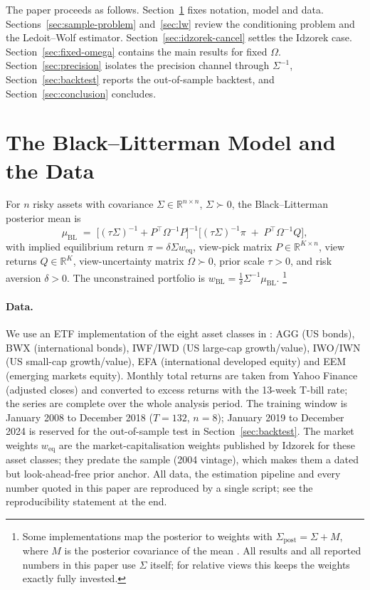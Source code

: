 \documentclass[a4paper,11pt]{article}
\theoremstyle{plain}
\theoremstyle{definition}
\newcommand{\R}{\mathbb{R}}
\newcommand{\Sig}{\Sigma}
\newcommand{\Om}{\Omega}
\newcommand{\muBL}{\mu_{\mathrm{BL}}}
\begin{document}
The paper proceeds as follows. Section~\ref{sec:blm-brief} fixes notation,
model and data. Sections~\ref{sec:sample-problem} and~\ref{sec:lw} review
the conditioning problem and the Ledoit--Wolf estimator.
Section~\ref{sec:idzorek-cancel} settles the Idzorek case.
Section~\ref{sec:fixed-omega} contains the main results for fixed
$\Omega$. Section~\ref{sec:precision} isolates the precision channel
through $\Sigma^{-1}$, Section~\ref{sec:backtest} reports the
out-of-sample backtest, and Section~\ref{sec:conclusion} concludes.

\section{The Black--Litterman Model and the Data}
\label{sec:blm-brief}

For $n$ risky assets with covariance $\Sigma\in\R^{n\times n}$,
$\Sigma\succ 0$, the Black--Litterman posterior mean is
\begin{equation}
\label{eq:bl-posterior}
  \muBL \;=\; \bigl[(\tau\Sig)^{-1} + P^\top\Om^{-1}P\bigr]^{-1}
              \bigl[(\tau\Sig)^{-1}\pi \;+\; P^\top\Om^{-1}Q\bigr],
\end{equation}
with implied equilibrium return $\pi = \delta\Sigma w_{\mathrm{eq}}$,
view-pick matrix $P\in\R^{K\times n}$, view returns $Q\in\R^K$,
view-uncertainty matrix $\Om\succ 0$, prior scale $\tau>0$, and risk
aversion $\delta>0$. The unconstrained portfolio is
$w_{\mathrm{BL}} = \tfrac{1}{\delta}\Sigma^{-1}\muBL$.%
\footnote{Some implementations map the posterior to weights with
$\Sigma_{\mathrm{post}} = \Sigma + M$, where $M$ is the posterior
covariance of the mean \citep{HeLitterman1999}. All results and all
reported numbers in this paper use $\Sigma$ itself; for relative views
this keeps the weights exactly fully invested.}

\paragraph{Data.}
We use an ETF implementation of the eight asset classes in
\citet{Idzorek2007}: AGG (US bonds), BWX (international bonds), IWF/IWD
(US large-cap growth/value), IWO/IWN (US small-cap growth/value), EFA
(international developed equity) and EEM (emerging markets equity). Monthly total returns are
taken from Yahoo Finance (adjusted closes) and converted to excess
returns with the 13-week T-bill rate; the series are complete over the
whole analysis period. The training window is January 2008 to December
2018 ($T=132$, $n=8$); January 2019 to December 2024 is reserved for the
out-of-sample test in Section~\ref{sec:backtest}. The market weights
$w_{\mathrm{eq}}$ are the market-capitalisation weights published by
Idzorek for these asset classes; they predate the sample (2004 vintage),
which makes them a dated but look-ahead-free prior anchor. All data,
the estimation pipeline and every number quoted in this paper are
reproduced by a single script; see the reproducibility statement at the
end.
\end{document}
